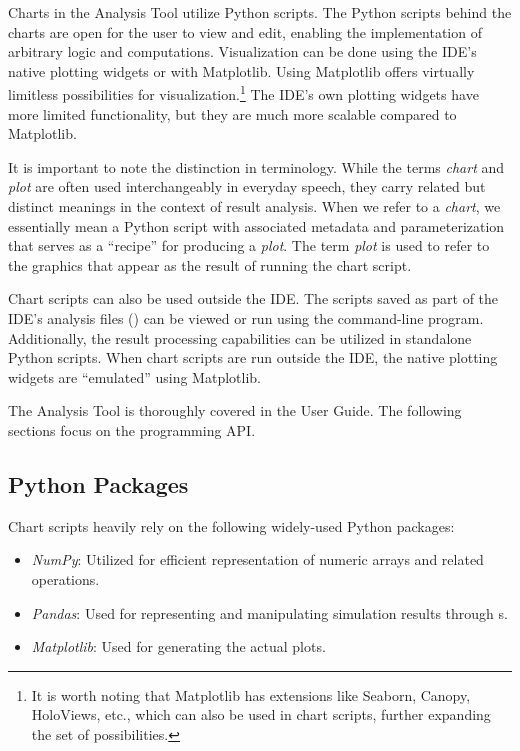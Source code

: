 Charts in the Analysis Tool utilize Python scripts. The Python scripts behind
the charts are open for the user to view and edit, enabling the implementation
of arbitrary logic and computations. Visualization can be done using the IDE's
native plotting widgets or with Matplotlib. Using Matplotlib offers virtually
limitless possibilities for visualization.\footnote{It is worth noting that
Matplotlib has extensions like Seaborn, Canopy, HoloViews, etc., which can also
be used in chart scripts, further expanding the set of possibilities.} The IDE's
own plotting widgets have more limited functionality, but they are much more
scalable compared to Matplotlib.

\begin{note}
It is important to note the distinction in terminology. While the terms
\textit{chart} and \textit{plot} are often used interchangeably in everyday
speech, they carry related but distinct meanings in the context of {\opp} result
analysis. When we refer to a \textit{chart}, we essentially mean a Python script
with associated metadata and parameterization that serves as a ``recipe'' for
producing a \textit{plot}. The term \textit{plot} is used to refer to the
graphics that appear as the result of running the chart script.
\end{note}

Chart scripts can also be used outside the IDE. The scripts saved as part of the
IDE's analysis files () can be viewed or run using the
 command-line program. Additionally, the result processing
capabilities can be utilized in standalone Python scripts. When chart scripts
are run outside the IDE, the native plotting widgets are ``emulated'' using
Matplotlib.

The Analysis Tool is thoroughly covered in the User Guide. The following
sections focus on the programming API.

\subsection{Python Packages}
\label{sec:ana-sim:python_packages}

Chart scripts heavily rely on the following widely-used Python packages:

\begin{itemize}
  \item \textit{NumPy}: Utilized for efficient representation of numeric arrays
    and related operations.
  \item \textit{Pandas}: Used for representing and manipulating simulation
    results through s.
  \item \textit{Matplotlib}: Used for generating the actual plots.
\end{itemize}

